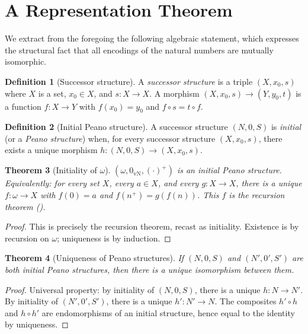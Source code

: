 \documentclass[12pt]{article}
\newtheorem{theorem}{Theorem}[section]
\theoremstyle{definition}
\newtheorem{definition}[theorem]{Definition}
\theoremstyle{remark}
\begin{document}
\section{A Representation Theorem}
\label{sec:representation}

We extract from the foregoing the following algebraic statement, which
expresses the structural fact that all encodings of the natural numbers
are mutually isomorphic.

\begin{definition}[Successor structure]\label{def:succ-struct}
A \emph{successor structure} is a triple $(X, x_0, s)$ where $X$ is a set,
$x_0 \in X$, and $s: X \to X$. A morphism $(X, x_0, s) \to (Y, y_0, t)$
is a function $f: X \to Y$ with $f(x_0) = y_0$ and $f \circ s = t \circ f$.
\end{definition}

\begin{definition}[Initial Peano structure]\label{def:init-peano}
A successor structure $(N, 0, S)$ is \emph{initial} (or a \emph{Peano
structure}) when, for every successor structure $(X, x_0, s)$, there exists
a unique morphism $h: (N, 0, S) \to (X, x_0, s)$.
\end{definition}

\begin{theorem}[Initiality of $\omega$]\label{thm:initiality}
$(\omega, 0_{\mathrm{vN}}, (\cdot)^+)$ is an initial Peano structure.
Equivalently: for every set $X$, every $a \in X$, and every $g: X \to X$,
there is a unique $f: \omega \to X$ with $f(0) = a$ and $f(n^+) = g(f(n))$.
This $f$ is the recursion theorem ().
\end{theorem}

\begin{proof}
This is precisely the recursion theorem, recast as initiality. Existence is
by recursion on $\omega$; uniqueness is by induction.
\end{proof}

\begin{theorem}[Uniqueness of Peano structures]\label{thm:uniqueness}
If $(N, 0, S)$ and $(N', 0', S')$ are both initial Peano structures, then
there is a unique isomorphism between them.
\end{theorem}

\begin{proof}
Universal property: by initiality of $(N, 0, S)$, there is a unique
$h: N \to N'$. By initiality of $(N', 0', S')$, there is a unique
$h': N' \to N$. The composites $h' \circ h$ and $h \circ h'$ are
endomorphisms of an initial structure, hence equal to the identity by
uniqueness.
\end{proof}
\end{document}
